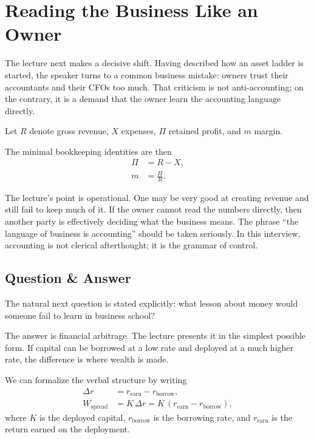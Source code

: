 \section{Reading the Business Like an Owner}

The lecture next makes a decisive shift. Having described how an asset ladder is started, the speaker turns to a common business mistake: owners trust their accountants and their CFOs too much. That criticism is not anti-accounting; on the contrary, it is a demand that the owner learn the accounting language directly.

\begin{definition}
Let \(R\) denote gross revenue, \(X\) expenses, \(\Pi\) retained profit, and \(m\) margin.
\end{definition}

The minimal bookkeeping identities are then
\begin{align}
\Pi &= R - X,\\
m &= \frac{\Pi}{R}.
\end{align}

The lecture's point is operational. One may be very good at creating revenue and still fail to keep much of it. If the owner cannot read the numbers directly, then another party is effectively deciding what the business means. The phrase ``the language of business is accounting'' should be taken seriously. In this interview, accounting is not clerical afterthought; it is the grammar of control.

\subsection{Question \& Answer}

The natural next question is stated explicitly: what lesson about money would someone fail to learn in business school?

The answer is financial arbitrage. The lecture presents it in the simplest possible form. If capital can be borrowed at a low rate and deployed at a much higher rate, the difference is where wealth is made.

We can formalize the verbal structure by writing
\begin{align}
\Delta r &= r_{\text{earn}} - r_{\text{borrow}},\\
W_{\text{spread}} &= K\,\Delta r = K\,(r_{\text{earn}} - r_{\text{borrow}}),
\end{align}
where \(K\) is the deployed capital, \(r_{\text{borrow}}\) is the borrowing rate, and \(r_{\text{earn}}\) is the return earned on the deployment.

